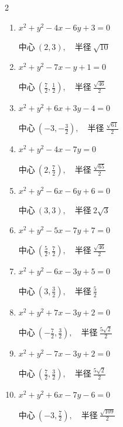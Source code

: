 \begin{multicols}{2}
\begin{enumerate}
        $\displaystyle 中心\: \left(2,\frac{5}{2}\right), \quad 半径 \ \frac{\sqrt{57}}{2}$

  \item $x^{2}+y^{2}-4x-6y+3=0$

        $\displaystyle 中心\: \left(2,3\right), \quad 半径 \ \sqrt{10}$

  \item $x^{2}+y^{2}-7x-y+1=0$

        $\displaystyle 中心\: \left(\frac{7}{2},\frac{1}{2}\right), \quad 半径 \ \frac{\sqrt{46}}{2}$

  \item $x^{2}+y^{2}+6x+3y-4=0$

        $\displaystyle 中心\: \left(-3,-\frac{3}{2}\right), \quad 半径 \ \frac{\sqrt{61}}{2}$

  \item $x^{2}+y^{2}-4x-7y=0$

        $\displaystyle 中心\: \left(2,\frac{7}{2}\right), \quad 半径 \ \frac{\sqrt{65}}{2}$

  \item $x^{2}+y^{2}-6x-6y+6=0$

        $\displaystyle 中心\: \left(3,3\right), \quad 半径 \ 2\sqrt{3}$

  \item $x^{2}+y^{2}-5x-7y+7=0$

        $\displaystyle 中心\: \left(\frac{5}{2},\frac{7}{2}\right), \quad 半径 \ \frac{\sqrt{46}}{2}$

  \item $x^{2}+y^{2}-6x-3y+5=0$

        $\displaystyle 中心\: \left(3,\frac{3}{2}\right), \quad 半径 \ \frac{5}{2}$

  \item $x^{2}+y^{2}+7x-3y+2=0$

        $\displaystyle 中心\: \left(-\frac{7}{2},\frac{3}{2}\right), \quad 半径 \ \frac{5\sqrt{2}}{2}$

  \item $x^{2}+y^{2}-7x-3y+2=0$

        $\displaystyle 中心\: \left(\frac{7}{2},\frac{3}{2}\right), \quad 半径 \ \frac{5\sqrt{2}}{2}$

  \item $x^{2}+y^{2}+6x-7y-6=0$

        $\displaystyle 中心\: \left(-3,\frac{7}{2}\right), \quad 半径 \ \frac{\sqrt{109}}{2}$

\columnbreak %


\end{enumerate}
\end{multicols}
